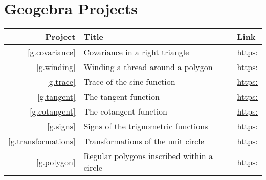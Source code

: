 
\appendix
\chapter{Geogebra Projects}\label{a.geogebra}

\begin{center}
\begin{tabular}{|r|p{7cm}|p{6cm}|}
\hline
Project & Title & Link\\
\hline
\ref{g.covariance} & Covariance in a right triangle & 
  \url{https:}\\\hline
\ref{g.winding} & Winding a thread around a polygon &
  \url{https:}\\\hline
\ref{g.trace} & Trace of the sine function & 
  \url{https:}\\\hline
\ref{g.tangent} & The tangent function & 
  \url{https:}\\\hline
\ref{g.cotangent} & The cotangent function &
  \url{https:}\\\hline
\ref{g.signs} & Signs of the trignometric functions &
  \url{https:}\\\hline
\ref{g.transformations} & Transformations of the unit circle &
  \url{https:}\\\hline
\ref{g.polygon} & Regular polygons inscribed within a circle & 
  \url{https:}\\\hline
\end{tabular}
\end{center}
